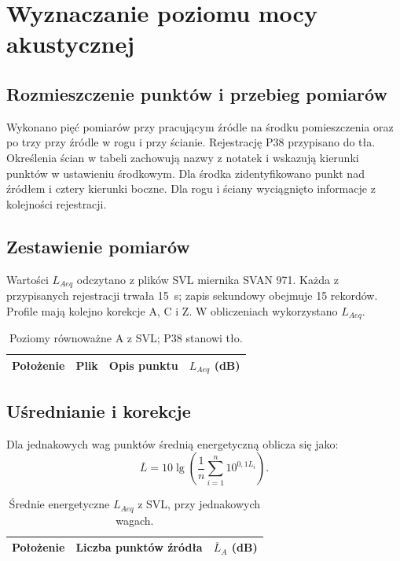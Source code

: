 \section{Wyznaczanie poziomu mocy akustycznej}
\subsection{Rozmieszczenie punktów i przebieg pomiarów}
Wykonano pięć pomiarów przy pracującym źródle na środku pomieszczenia
oraz po trzy przy źródle w rogu i przy ścianie. Rejestrację P38 przypisano
do tła.
Określenia ścian w tabeli zachowują nazwy z notatek i wskazują kierunki
punktów w ustawieniu środkowym.
Dla środka zidentyfikowano punkt nad źródłem i cztery kierunki boczne.
Dla rogu i ściany wyciągnięto informacje z kolejności rejestracji.

\subsection{Zestawienie pomiarów}
Wartości $L_{Aeq}$ odczytano z plików SVL miernika SVAN 971.
Każda z przypisanych rejestracji trwała \qty{15}{\second}; zapis sekundowy
obejmuje 15 rekordów. Profile mają kolejno korekcje A, C i Z.
W obliczeniach wykorzystano $L_{Aeq}$.

\begin{table}[H]
\centering\small
\caption{Poziomy równoważne A z SVL; P38 stanowi tło.}
\begin{tabularx}{\linewidth}{@{}l l L r@{}}
\toprule
Położenie & Plik & Opis punktu & $L_{Aeq}$ (dB)\\
\midrule

\end{tabularx}
\end{table}

\subsection{Uśrednianie i korekcje}
Dla jednakowych wag punktów średnią energetyczną oblicza się jako:
\begin{equation}
\overline L=10\lg\left(\frac{1}{n}\sum_{i=1}^n10^{0{,}1L_i}\right).
\end{equation}
\begin{table}[H]
\centering
\caption{Średnie energetyczne $L_{Aeq}$ z SVL, przy jednakowych wagach.}
\begin{tabular}{@{}l c r@{}}
\toprule
Położenie & Liczba punktów źródła & $\overline L_A$ (dB)\\
\midrule

\end{tabular}
\end{table}

